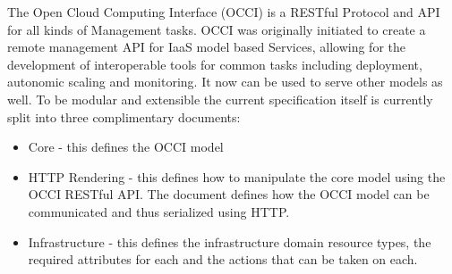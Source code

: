 The Open Cloud Computing Interface (OCCI) is a RESTful Protocol and
API for all kinds of Management tasks. OCCI was originally initiated
to create a remote management API for IaaS model based Services,
allowing for the development of interoperable tools for common tasks
including deployment, autonomic scaling and monitoring. It now can be
used to serve other models as well. To be modular and extensible the
current specification itself is currently split into three
complimentary documents:

\begin{itemize}
\item Core - this defines the OCCI model
\item HTTP Rendering - this defines how to manipulate the core model
  using the OCCI RESTful API. The document defines how the OCCI model
  can be communicated and thus serialized using HTTP.
\item Infrastructure - this defines the infrastructure domain resource
  types, the required attributes for each and the actions that can be
  taken on each.
\end{itemize}
